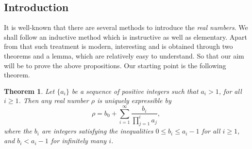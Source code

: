 \documentclass[12pt]{article}
\newtheorem{theorem}{Theorem}
\begin{document}
\subsection{Introduction}
It is well-known that there are several methods to introduce the {\em real numbers}. We shall follow an inductive method which is instructive as well as elementary. Apart from that such treatment is modern, interesting and is obtained through two theorems and a lemma, which are relatively easy to understand. So that our aim will be to prove the above propositions.  Our starting point is the following theorem.
\begin{theorem}
Let $\{a_i\}$ be a sequence of positive integers such that $a_i>1$, for all $i\geq 1$. Then any real number $\rho$ is uniquely expressible by
\begin{equation}
\rho = b_0 + \sum_{i=1}^\infty \frac{b_i}{\prod_{j=1}^i a_j},
\end{equation}
where the $b_i$ are integers satisfying the inequalities $0\leq b_i\leq a_i-1$ for all $i\geq 1$, and $b_i<a_i-1$ for infinitely many $i$.
\end{theorem} 
\end{document}

